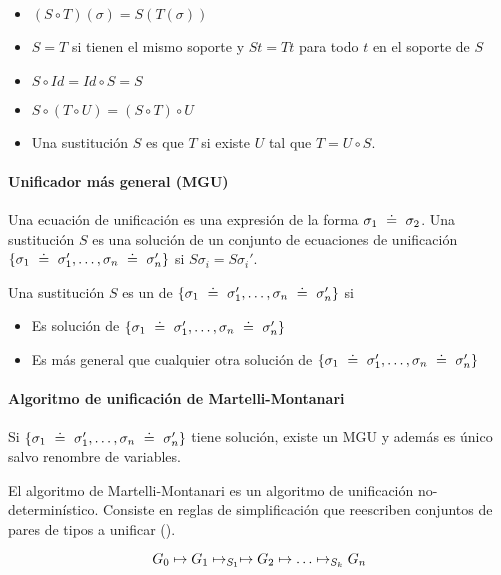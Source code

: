 \begin{itemize}
  \item {} $(S \circ T)(\sigma) = S(T(\sigma))$
  \item {} $S = T$ si tienen el mismo soporte y $St = Tt$ para todo $t$ en el soporte de $S$
  \item $S \circ Id = Id \circ S = S$
  \item $S \circ (T \circ U) = (S \circ T) \circ U$
  \item Una sustitución $S$ es  que $T$ si existe $U$ tal que $T = U \circ S$.
\end{itemize}

\paragraph{Unificador más general (MGU)}

Una ecuación de unificación es una expresión de la forma $\sigma_1 \uni \sigma_2$. Una sustitución $S$ es una solución de un conjunto de ecuaciones de unificación $\{\sigma_1 \uni \sigma_1', \dots, \sigma_n \uni \sigma_n'\}$ si $S\sigma_i = S\sigma_i'$.

Una sustitución $S$ es un  de $\{\sigma_1 \uni \sigma_1', \dots, \sigma_n \uni \sigma_n'\}$ si
\begin{itemize}
  \item Es solución de $\{\sigma_1 \uni \sigma_1', \dots, \sigma_n \uni \sigma_n'\}$
  \item Es más general que cualquier otra solución de $\{\sigma_1 \uni \sigma_1', \dots, \sigma_n \uni \sigma_n'\}$
\end{itemize}

\paragraph{Algoritmo de unificación de Martelli-Montanari}

\begin{teo}
  Si $\{\sigma_1 \uni \sigma_1', \dots, \sigma_n \uni \sigma_n'\}$ tiene solución, existe un MGU y además es único salvo renombre de variables.
\end{teo}

El algoritmo de Martelli-Montanari es un algoritmo de unificación no-determinístico. Consiste en reglas de simplificación que reescriben conjuntos de pares de tipos a unificar ().

\[G_0 \unito G_1 \unito_{S_1} \unito G_2 \unito \dots \unito_{S_k} G_n\]

